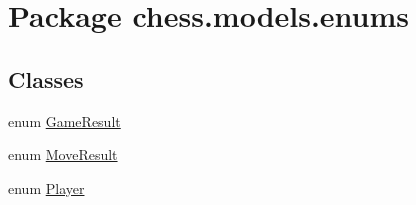 \hypertarget{namespacechess_1_1models_1_1enums}{}\section{Package chess.\+models.\+enums}
\label{namespacechess_1_1models_1_1enums}
\subsection*{Classes}
\begin{DoxyCompactItemize}
\item 
enum \mbox{\hyperlink{enumchess_1_1models_1_1enums_1_1_game_result}{Game\+Result}}
\item 
enum \mbox{\hyperlink{enumchess_1_1models_1_1enums_1_1_move_result}{Move\+Result}}
\item 
enum \mbox{\hyperlink{enumchess_1_1models_1_1enums_1_1_player}{Player}}
\end{DoxyCompactItemize}
